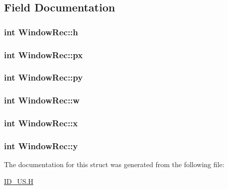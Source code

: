 \subsection{Field Documentation}
\hypertarget{structWindowRec_a3aaa5408ac1d2e1196b83ef72312f0ac}{
\subsubsection[{h}]{\setlength{\rightskip}{0pt plus 5cm}int {\bf WindowRec::h}}}
\label{structWindowRec_a3aaa5408ac1d2e1196b83ef72312f0ac}
\hypertarget{structWindowRec_a24cd10a3d46de5ce680eab7c5d236a7b}{
\subsubsection[{px}]{\setlength{\rightskip}{0pt plus 5cm}int {\bf WindowRec::px}}}
\label{structWindowRec_a24cd10a3d46de5ce680eab7c5d236a7b}
\hypertarget{structWindowRec_a99d1e632f2891aeb9555520ef5a257a8}{
\subsubsection[{py}]{\setlength{\rightskip}{0pt plus 5cm}int {\bf WindowRec::py}}}
\label{structWindowRec_a99d1e632f2891aeb9555520ef5a257a8}
\hypertarget{structWindowRec_af51253796a178bef8aaf64f4fc6d6742}{
\subsubsection[{w}]{\setlength{\rightskip}{0pt plus 5cm}int {\bf WindowRec::w}}}
\label{structWindowRec_af51253796a178bef8aaf64f4fc6d6742}
\hypertarget{structWindowRec_a8ddc970ca8233167841d9639d08201bf}{
\subsubsection[{x}]{\setlength{\rightskip}{0pt plus 5cm}int {\bf WindowRec::x}}}
\label{structWindowRec_a8ddc970ca8233167841d9639d08201bf}
\hypertarget{structWindowRec_ab92158805a04a027ed057ee13452e1d7}{
\subsubsection[{y}]{\setlength{\rightskip}{0pt plus 5cm}int {\bf WindowRec::y}}}
\label{structWindowRec_ab92158805a04a027ed057ee13452e1d7}


The documentation for this struct was generated from the following file:\begin{DoxyCompactItemize}
\item 
\hyperlink{ID__US_8H}{ID\_\-US.H}\end{DoxyCompactItemize}
